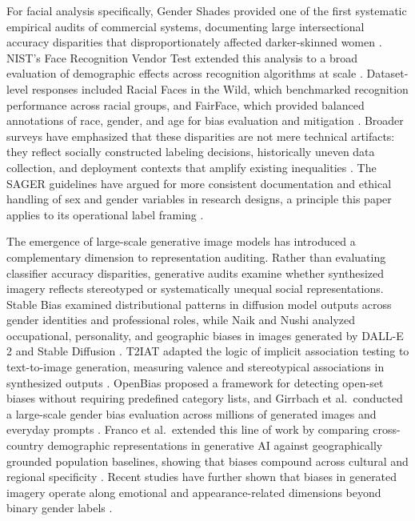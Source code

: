 \documentclass{article}
\begin{document}
For facial analysis specifically, Gender Shades provided one of the first systematic empirical audits of commercial systems, documenting large intersectional accuracy disparities that disproportionately affected darker-skinned women \cite{buolamwini2018gender}. NIST's Face Recognition Vendor Test extended this analysis to a broad evaluation of demographic effects across recognition algorithms at scale \cite{grother2019frvt}. Dataset-level responses included Racial Faces in the Wild, which benchmarked recognition performance across racial groups, and FairFace, which provided balanced annotations of race, gender, and age for bias evaluation and mitigation \cite{wang2019rfw,karkkainen2021fairface}. Broader surveys have emphasized that these disparities are not mere technical artifacts: they reflect socially constructed labeling decisions, historically uneven data collection, and deployment contexts that amplify existing inequalities \cite{mehrabi2021survey}. The SAGER guidelines have argued for more consistent documentation and ethical handling of sex and gender variables in research designs, a principle this paper applies to its operational label framing \cite{heidari2016sager}.

The emergence of large-scale generative image models has introduced a complementary dimension to representation auditing. Rather than evaluating classifier accuracy disparities, generative audits examine whether synthesized imagery reflects stereotyped or systematically unequal social representations. Stable Bias examined distributional patterns in diffusion model outputs across gender identities and professional roles, while Naik and Nushi analyzed occupational, personality, and geographic biases in images generated by DALL-E 2 and Stable Diffusion \cite{luccioni2023stablebias,naik2023socialbiases}. T2IAT adapted the logic of implicit association testing to text-to-image generation, measuring valence and stereotypical associations in synthesized outputs \cite{wang2023t2iat}. OpenBias proposed a framework for detecting open-set biases without requiring predefined category lists, and Girrbach et al.\ conducted a large-scale gender bias evaluation across millions of generated images and everyday prompts \cite{dinca2024openbias,girrbach2025largescale}. Franco et al.\ extended this line of work by comparing cross-country demographic representations in generative AI against geographically grounded population baselines, showing that biases compound across cultural and regional specificity \cite{franco2026biasbeyondborders}. Recent studies have further shown that biases in generated imagery operate along emotional and appearance-related dimensions beyond binary gender labels \cite{bianchi2023easily}.
\end{document}
